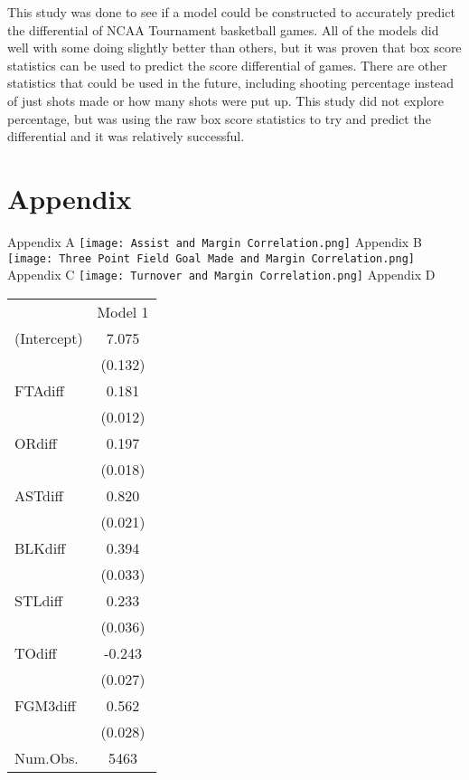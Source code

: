 \documentclass{article}
\begin{document}
\newline \indent This study was done to see if a model could be constructed to accurately predict the differential of NCAA Tournament basketball games. All of the models did well with some doing slightly better than others, but it was proven that box score statistics can be used to predict the score differential of games. There are other statistics that could be used in the future, including shooting percentage instead of just shots made or how many shots were put up. This study did not explore percentage, but was using the raw box score statistics to try and predict the differential and it was relatively successful. 
\medskip

\newpage



\section{Appendix}
Appendix A
\texttt{[image: Assist and Margin Correlation.png]}
\centering
\newline
\newline
\newline
\newline
Appendix B
\texttt{[image: Three Point Field Goal Made and Margin Correlation.png]}
\centering
\newline
\newline
\newline
\newline
\newline
\newline
Appendix C
\texttt{[image: Turnover and Margin Correlation.png]}
\centering
\newpage
Appendix D
\begin{table}
\centering
\begin{tabular}[t]{lc}
  & Model 1\\
(Intercept) & 7.075\\
 & (0.132)\\
FTAdiff & 0.181\\
 & (0.012)\\
ORdiff & 0.197\\
 & (0.018)\\
ASTdiff & 0.820\\
 & (0.021)\\
BLKdiff & 0.394\\
 & (0.033)\\
STLdiff & 0.233\\
 & (0.036)\\
TOdiff & -0.243\\
 & (0.027)\\
FGM3diff & 0.562\\
 & (0.028)\\
Num.Obs. & 5463\\
\end{tabular}
\end{table}
\end{document}
